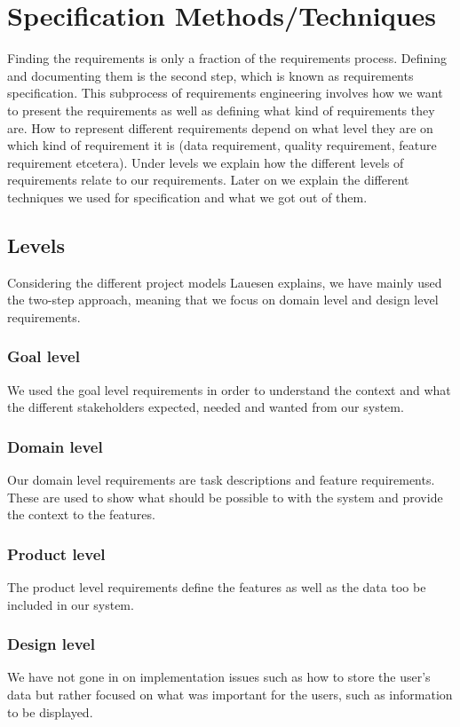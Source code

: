 \documentclass[a4paper]{article}
\begin{document}
	\section{Specification Methods/Techniques}
	Finding the requirements is only a fraction of the requirements process. Defining and documenting them is the second step, which is known as requirements specification. This subprocess of requirements engineering involves how we want to present the requirements as well as defining what kind of requirements they are. How to represent different requirements depend on what level they are on which kind of requirement it is (data requirement, quality requirement, feature requirement etcetera). Under
levels we explain how the different levels of requirements relate to our requirements.  Later on we explain the different techniques we used for specification and what we got out of them.

	\subsection{Levels}

		Considering the different project models Lauesen explains, we have mainly used the two-step approach, meaning that we focus on domain level and design level requirements.
		\subsubsection{Goal level}
			We used the goal level requirements in order to understand the context and what the different stakeholders expected, needed and wanted from our system.
		\subsubsection{Domain level}
			Our domain level requirements are task descriptions and feature requirements. These are used to show what should be possible to with the system and provide the context to the features.
		\subsubsection{Product level}
			The product level requirements define the features as well as the data too be included in our system.
		\subsubsection{Design level}
			We have not gone in on implementation issues such as how to store the user's data but rather focused on what was important for the users, such as information to be displayed.
		
\end{document}
